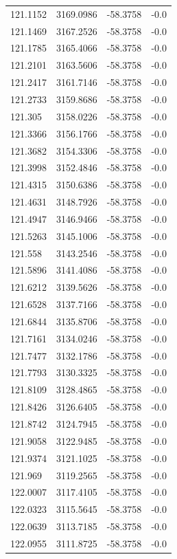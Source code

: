 \begin{table}[H]
\begin{tabular}{llll}
121.1152 & 3169.0986 & -58.3758 & -0.0 \\
121.1469 & 3167.2526 & -58.3758 & -0.0 \\
121.1785 & 3165.4066 & -58.3758 & -0.0 \\
121.2101 & 3163.5606 & -58.3758 & -0.0 \\
121.2417 & 3161.7146 & -58.3758 & -0.0 \\
121.2733 & 3159.8686 & -58.3758 & -0.0 \\
121.305 & 3158.0226 & -58.3758 & -0.0 \\
121.3366 & 3156.1766 & -58.3758 & -0.0 \\
121.3682 & 3154.3306 & -58.3758 & -0.0 \\
121.3998 & 3152.4846 & -58.3758 & -0.0 \\
121.4315 & 3150.6386 & -58.3758 & -0.0 \\
121.4631 & 3148.7926 & -58.3758 & -0.0 \\
121.4947 & 3146.9466 & -58.3758 & -0.0 \\
121.5263 & 3145.1006 & -58.3758 & -0.0 \\
121.558 & 3143.2546 & -58.3758 & -0.0 \\
121.5896 & 3141.4086 & -58.3758 & -0.0 \\
121.6212 & 3139.5626 & -58.3758 & -0.0 \\
121.6528 & 3137.7166 & -58.3758 & -0.0 \\
121.6844 & 3135.8706 & -58.3758 & -0.0 \\
121.7161 & 3134.0246 & -58.3758 & -0.0 \\
121.7477 & 3132.1786 & -58.3758 & -0.0 \\
121.7793 & 3130.3325 & -58.3758 & -0.0 \\
121.8109 & 3128.4865 & -58.3758 & -0.0 \\
121.8426 & 3126.6405 & -58.3758 & -0.0 \\
121.8742 & 3124.7945 & -58.3758 & -0.0 \\
121.9058 & 3122.9485 & -58.3758 & -0.0 \\
121.9374 & 3121.1025 & -58.3758 & -0.0 \\
121.969 & 3119.2565 & -58.3758 & -0.0 \\
122.0007 & 3117.4105 & -58.3758 & -0.0 \\
122.0323 & 3115.5645 & -58.3758 & -0.0 \\
122.0639 & 3113.7185 & -58.3758 & -0.0 \\
122.0955 & 3111.8725 & -58.3758 & -0.0 \\

\end{tabular}
\end{table}
